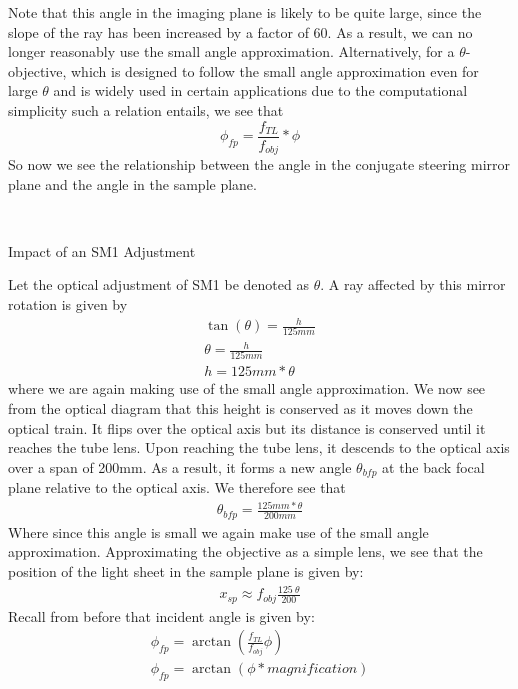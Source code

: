 Note that this angle in the imaging plane is likely to be quite large, since the slope of the ray has been increased by a factor of 60. As a result, we can no longer reasonably use the small angle approximation.
Alternatively, for a $\theta$-objective, which is designed to follow the small angle approximation even for large $\theta$ and is widely used in certain applications due to the computational simplicity such a relation entails, we see that
\begin{equation}
    \phi_{fp} = \frac{f_{TL}}{f_{obj}} * \phi
\end{equation}
So now we see the relationship between the angle in the conjugate steering mirror plane and the angle in the sample plane.

\\
\begin{center}
    Impact of an SM1 Adjustment
\end{center}
Let the optical adjustment of SM1 be denoted as $\theta$. A ray affected by this mirror rotation is given by \begin{gather}
    \tan(\theta)= \frac{h}{125mm}\\
    \theta = \frac{h}{125mm}\\
    h= {125mm}*\theta
\end{gather}
where we are again making use of the small angle approximation. We now see from the optical diagram that this height is conserved as it moves down the optical train. It flips over the optical axis but its distance is conserved until it reaches the tube lens. Upon reaching the tube lens, it descends to the optical axis over a span of 200mm. As a result, it forms a new angle $\theta_{bfp}$ at the back focal plane relative to the optical axis. We therefore see that
\begin{gather}
    \theta_{bfp} = \frac{125mm*\theta}{200mm}
\end{gather}
Where since this angle is small we again make use of the small angle approximation. Approximating the objective as a simple lens, we see that the position of the light sheet in the sample plane is given by:
\begin{gather}
    x_{sp} \approx f_{obj} \frac{125\ \theta}{200}
\end{gather}
Recall from before that incident angle is given by:
\begin{gather}
    \phi_{fp} = \arctan(\frac{f_{TL}}{f_{obj}}\phi)\\
    \phi_{fp} = \arctan(\phi * magnification)
\end{gather}
